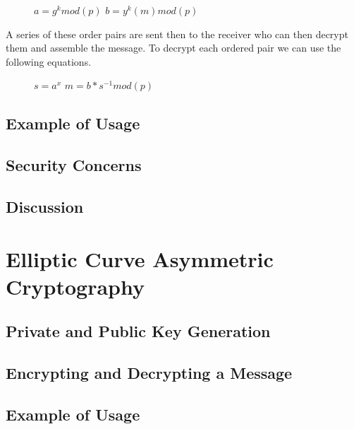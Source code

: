 \documentclass[conference]{IEEEtran}
\begin{document}
\begin{figure}[h]
	\begin{center}
		$a={g}^{k}mod\left(p\right)$ \newline
		$b={y}^{k}\left(m\right)mod\left(p\right)$ \newline
	\end{center}
\end{figure}

A series of these order pairs are sent then to the receiver who can then decrypt them and assemble the message. To decrypt each ordered pair we can use the following equations.

\begin{figure}[H]
	\begin{center}
		$s={a}^{x}$ \newline
		$m=b * {s}^{-1} mod\left(p\right)$ \newline
	\end{center}
\end{figure}


\subsection{Example of Usage}

\color{red}
\subsection{Security Concerns}

\subsection{Discussion}

\section{Elliptic Curve Asymmetric Cryptography}

\subsection{Private and Public Key Generation}

\subsection{Encrypting and Decrypting a Message}

\subsection{Example of Usage}
\end{document}
